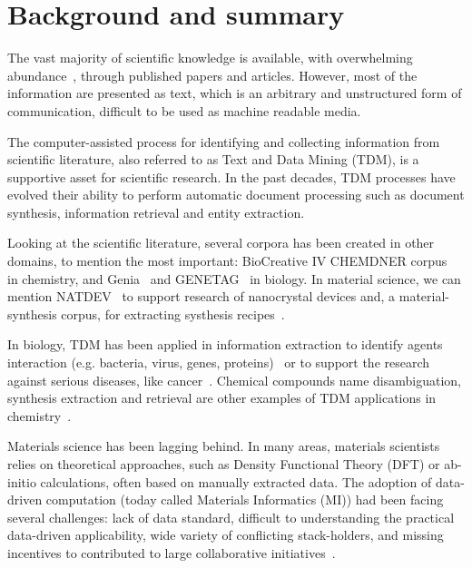 \documentclass[a4paper,10pt]{article}
\begin{document}
\newpage

\section{Background and summary}
The vast majority of scientific knowledge is available, with overwhelming abundance~\cite{Grigas2017JustGI, Khabsa2014TheNO, OrduaMalea2015MethodsFE, Bjrk2009ScientificJP}, through published papers and articles. 
However, most of the information are presented as text, which is an arbitrary and unstructured form of communication, difficult to be used as machine readable media. 

The computer-assisted process for identifying and collecting information from scientific literature, also referred to as Text and Data Mining (TDM), is a supportive asset for scientific research. 
In the past decades, TDM processes have evolved their ability to perform automatic document processing such as document synthesis, information retrieval and entity extraction. 


Looking at the scientific literature, several corpora has been created in other domains, to mention the most important: BioCreative IV CHEMDNER corpus~\cite{Krallinger2015TheCC} in chemistry, and Genia~\cite{Kim2003GENIAC} and GENETAG~\cite{Tanabe2005GENETAGAT, Ohta2009IncorporatingGA} in biology. In material science, we can mention NATDEV~\cite{Dieb2016} to support research of nanocrystal devices and, a material-synthesis corpus, for extracting systhesis recipes~\cite{kononova_text-mined_2019}. 

In biology, TDM has been applied in information extraction to identify agents interaction (e.g. bacteria, virus, genes, proteins)~\cite{10.1371/journal.pone.0004554, Krallinger2010, Krallinger2009ExtractionOH} or to support the research against serious diseases, like cancer~\cite{Krasnitz2019CancerB}. 
Chemical compounds name disambiguation, synthesis extraction and retrieval are other examples of TDM applications in chemistry~\cite{Hawizy2011ChemicalTaggerAT}.

Materials science has been lagging behind. In many areas, materials scientists relies on theoretical approaches, such as Density Functional Theory (DFT) or ab-initio calculations, often based on manually extracted data. 
The adoption of data-driven computation (today called Materials Informatics (MI)) had been facing several challenges: lack of data standard, difficult to understanding the practical data-driven applicability, wide variety of conflicting stack-holders, and missing incentives to contributed to large collaborative initiatives~\cite{Hill2016MaterialsSW}. 
\end{document}
